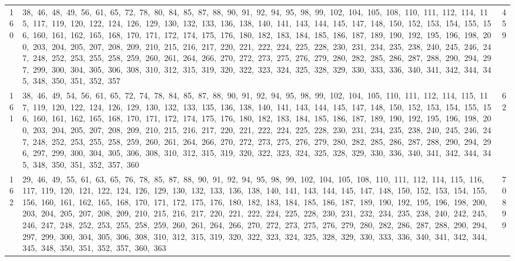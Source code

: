 \begin{longtable}{c|p{}|r}
160 & 38,\ 46,\ 48,\ 49,\ 56,\ 61,\ 65,\ 72,\ 78,\ 80,\ 84,\ 85,\ 87,\ 88,\ 90,\ 91,\ 92,\ 94,\ 95,\ 98,\ 99,\ 102,\ 104,\ 105,\ 108,\ 110,\ 111,\ 112,\ 114,\ 115,\ 117,\ 119,\ 120,\ 122,\ 124,\ 126,\ 129,\ 130,\ 132,\ 133,\ 136,\ 138,\ 140,\ 141,\ 143,\ 144,\ 145,\ 147,\ 148,\ 150,\ 152,\ 153,\ 154,\ 155,\ 156,\ 160,\ 161,\ 162,\ 165,\ 168,\ 170,\ 171,\ 172,\ 174,\ 175,\ 176,\ 180,\ 182,\ 183,\ 184,\ 185,\ 186,\ 187,\ 189,\ 190,\ 192,\ 195,\ 196,\ 198,\ 200,\ 203,\ 204,\ 205,\ 207,\ 208,\ 209,\ 210,\ 215,\ 216,\ 217,\ 220,\ 221,\ 222,\ 224,\ 225,\ 228,\ 230,\ 231,\ 234,\ 235,\ 238,\ 240,\ 245,\ 246,\ 247,\ 248,\ 252,\ 253,\ 255,\ 258,\ 259,\ 260,\ 261,\ 264,\ 266,\ 270,\ 272,\ 273,\ 275,\ 276,\ 279,\ 280,\ 282,\ 285,\ 286,\ 287,\ 288,\ 290,\ 294,\ 297,\ 299,\ 300,\ 304,\ 305,\ 306,\ 308,\ 310,\ 312,\ 315,\ 319,\ 320,\ 322,\ 323,\ 324,\ 325,\ 328,\ 329,\ 330,\ 333,\ 336,\ 340,\ 341,\ 342,\ 344,\ 345,\ 348,\ 350,\ 351,\ 352,\ 357 & 459 \\
161 & 38,\ 46,\ 49,\ 54,\ 56,\ 61,\ 65,\ 72,\ 74,\ 78,\ 84,\ 85,\ 87,\ 88,\ 90,\ 91,\ 92,\ 94,\ 95,\ 98,\ 99,\ 102,\ 104,\ 105,\ 110,\ 111,\ 112,\ 114,\ 115,\ 117,\ 119,\ 120,\ 122,\ 124,\ 126,\ 129,\ 130,\ 132,\ 133,\ 135,\ 136,\ 138,\ 140,\ 141,\ 143,\ 144,\ 145,\ 147,\ 148,\ 150,\ 152,\ 153,\ 154,\ 155,\ 156,\ 160,\ 161,\ 162,\ 165,\ 168,\ 170,\ 171,\ 172,\ 174,\ 175,\ 176,\ 180,\ 182,\ 183,\ 184,\ 185,\ 186,\ 187,\ 189,\ 190,\ 192,\ 195,\ 196,\ 198,\ 200,\ 203,\ 204,\ 205,\ 207,\ 208,\ 209,\ 210,\ 215,\ 216,\ 217,\ 220,\ 221,\ 222,\ 224,\ 225,\ 228,\ 230,\ 231,\ 234,\ 235,\ 238,\ 240,\ 245,\ 246,\ 247,\ 248,\ 252,\ 253,\ 255,\ 258,\ 259,\ 260,\ 261,\ 264,\ 266,\ 270,\ 272,\ 273,\ 275,\ 276,\ 279,\ 280,\ 282,\ 285,\ 286,\ 287,\ 288,\ 290,\ 294,\ 296,\ 297,\ 299,\ 300,\ 304,\ 305,\ 306,\ 308,\ 310,\ 312,\ 315,\ 319,\ 320,\ 322,\ 323,\ 324,\ 325,\ 328,\ 329,\ 330,\ 336,\ 340,\ 341,\ 342,\ 344,\ 345,\ 348,\ 350,\ 351,\ 352,\ 357,\ 360 & 62 \\
162 & 29,\ 46,\ 49,\ 55,\ 61,\ 63,\ 65,\ 76,\ 78,\ 85,\ 87,\ 88,\ 90,\ 91,\ 92,\ 94,\ 95,\ 98,\ 99,\ 102,\ 104,\ 105,\ 108,\ 110,\ 111,\ 112,\ 114,\ 115,\ 116,\ 117,\ 119,\ 120,\ 121,\ 122,\ 124,\ 126,\ 129,\ 130,\ 132,\ 133,\ 136,\ 138,\ 140,\ 141,\ 143,\ 144,\ 145,\ 147,\ 148,\ 150,\ 152,\ 153,\ 154,\ 155,\ 156,\ 160,\ 161,\ 162,\ 165,\ 168,\ 170,\ 171,\ 172,\ 175,\ 176,\ 180,\ 182,\ 183,\ 184,\ 185,\ 186,\ 187,\ 189,\ 190,\ 192,\ 195,\ 196,\ 198,\ 200,\ 203,\ 204,\ 205,\ 207,\ 208,\ 209,\ 210,\ 215,\ 216,\ 217,\ 220,\ 221,\ 222,\ 224,\ 225,\ 228,\ 230,\ 231,\ 232,\ 234,\ 235,\ 238,\ 240,\ 242,\ 245,\ 246,\ 247,\ 248,\ 252,\ 253,\ 255,\ 258,\ 259,\ 260,\ 261,\ 264,\ 266,\ 270,\ 272,\ 273,\ 275,\ 276,\ 279,\ 280,\ 282,\ 286,\ 287,\ 288,\ 290,\ 294,\ 297,\ 299,\ 300,\ 304,\ 305,\ 306,\ 308,\ 310,\ 312,\ 315,\ 319,\ 320,\ 322,\ 323,\ 324,\ 325,\ 328,\ 329,\ 330,\ 333,\ 336,\ 340,\ 341,\ 342,\ 344,\ 345,\ 348,\ 350,\ 351,\ 352,\ 357,\ 360,\ 363 & 70899 \\

\end{longtable}
